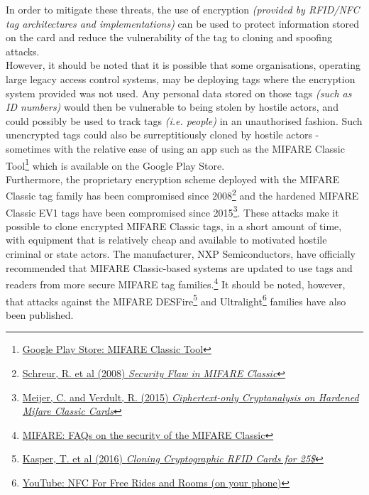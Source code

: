 \noindent In order to mitigate these threats, the use of encryption \textit{(provided by RFID/NFC tag architectures and implementations)} can be used to protect information stored on the card and reduce the vulnerability of the tag to cloning and spoofing attacks.\\

\noindent However, it should be noted that it is possible that some organisations, operating large legacy access control systems, may be deploying tags where the encryption system provided was not used. Any personal data stored on those tags \textit{(such as ID numbers)} would then be vulnerable to being stolen by hostile actors, and could possibly be used to track tags \textit{(i.e. people)} in an unauthorised fashion. Such unencrypted tags could also be surreptitiously cloned by hostile actors - sometimes with the relative ease of using an app such as the MIFARE Classic Tool\footnote{\href{https://play.google.com/store/apps/details?id=de.syss.MifareClassicTool&hl=en_GB&rdid=de.syss.MifareClassicTool}{Google Play Store: MIFARE Classic Tool}} which is available on the Google Play Store.\\

\noindent Furthermore, the proprietary encryption scheme deployed with the MIFARE Classic tag family has been compromised since 2008\footnote{\href{http://www.cs.ru.nl/~flaviog/publications/Security_Flaw_in_MIFARE_Classic.pdf}{Schreur, R. et al (2008) \textit{Security Flaw in MIFARE Classic}}} and the hardened MIFARE Classic EV1 tags have been compromised since 2015\footnote{\href{http://cs.ru.nl/~rverdult/Ciphertext-only_Cryptanalysis_on_Hardened_Mifare_Classic_Cards-CCS_2015.pdf}{Meijer, C. and Verdult, R. (2015) \textit{Ciphertext-only Cryptanalysis on Hardened Mifare Classic Cards}}}. These attacks make it possible to clone encrypted MIFARE Classic tags, in a short amount of time, with equipment that is relatively cheap and available to motivated hostile criminal or state actors. The manufacturer, NXP Semiconductors, have officially recommended that MIFARE Classic-based systems are updated to use tags and readers from more secure MIFARE tag families.\footnote{\href{https://www.mifare.net/en/products/chip-card-ics/mifare-classic/frequently-asked-questions/}{MIFARE: FAQs on the security of the MIFARE Classic}} It should be noted, however, that attacks against the MIFARE DESFire\footnote{\href{http://www.proxmark.org/files/Documents/13.56\%20MHz\%20-\%20MIFARE\%20DESFire/Cloning_Cryptographic_RFID_Cards_for_25USD-WISSEC_2010.pdf}{Kasper, T. et al (2016) \textit{Cloning Cryptographic RFID Cards for 25\$}}} and Ultralight\footnote{\href{https://www.youtube.com/watch?v=-uvvVMHnC3c}{YouTube: NFC For Free Rides and Rooms (on your phone)}} families have also been published.\\

